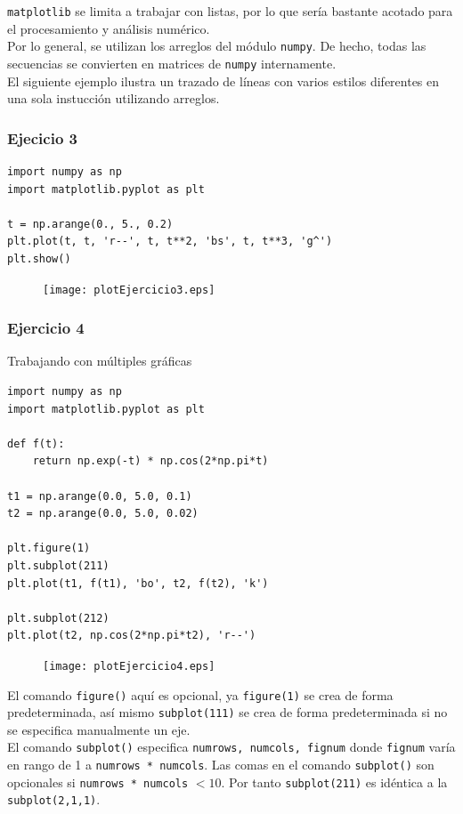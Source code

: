 \begin{frame}
\texttt{matplotlib} se limita a trabajar con listas, por lo que sería bastante acotado para el procesamiento y análisis numérico.
\\
\medskip
Por lo general, se utilizan los arreglos del módulo \texttt{numpy}. De hecho, todas las secuencias se convierten en matrices de \texttt{numpy} internamente.
\\
\medskip
El siguiente ejemplo ilustra un trazado de líneas con varios estilos diferentes en una sola instucción utilizando arreglos.
\end{frame}
\begin{frame}[fragile]
\frametitle{Ejecicio 3}
\begin{lstlisting}
import numpy as np
import matplotlib.pyplot as plt

t = np.arange(0., 5., 0.2)
plt.plot(t, t, 'r--', t, t**2, 'bs', t, t**3, 'g^')
plt.show()
\end{lstlisting}
\end{frame}
\begin{frame}[fragile]
\begin{figure}
	\centering
	\texttt{[image: plotEjercicio3.eps]}
\end{figure}
\end{frame}
\begin{frame}[fragile]
\frametitle{Ejercicio 4}
Trabajando con múltiples gráficas
\begin{lstlisting}
import numpy as np
import matplotlib.pyplot as plt

def f(t):
    return np.exp(-t) * np.cos(2*np.pi*t)

t1 = np.arange(0.0, 5.0, 0.1)
t2 = np.arange(0.0, 5.0, 0.02)

plt.figure(1)
plt.subplot(211)
plt.plot(t1, f(t1), 'bo', t2, f(t2), 'k')

plt.subplot(212)
plt.plot(t2, np.cos(2*np.pi*t2), 'r--')
\end{lstlisting}
\end{frame}
\begin{frame}[fragile]
\begin{figure}
	\centering
	\texttt{[image: plotEjercicio4.eps]}
\end{figure}
\end{frame}
\begin{frame}
El comando \texttt{figure()} aquí es opcional, ya \texttt{figure(1)} se crea de forma predeterminada, así mismo \texttt{subplot(111)} se crea de forma predeterminada si no se especifica manualmente un eje.
\\
\medskip
El comando \texttt{subplot()} especifica \texttt{numrows, numcols, fignum} donde \texttt{fignum} varía en rango de 1 a \texttt{numrows * numcols}. Las comas en el comando \texttt{subplot()} son opcionales si \texttt{numrows * numcols} $<10$. Por tanto \texttt{subplot(211)} es idéntica a la \texttt{subplot(2,1,1)}.
\end{frame}
